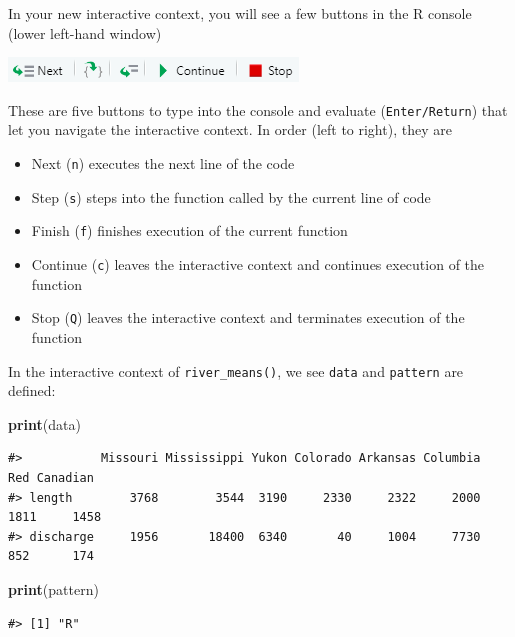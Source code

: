 \documentclass[
]{book}
\newenvironment{Shaded}{\begin{snugshade}}{\end{snugshade}}
\newcommand{\KeywordTok}[1]{\textcolor[rgb]{0.13,0.29,0.53}{\textbf{#1}}}
\newcommand{\NormalTok}[1]{#1}
\providecommand{\tightlist}{%
  \setlength{\itemsep}{0pt}\setlength{\parskip}{0pt}}
\begin{document}
In your new interactive context, you will see a few buttons in the R console (lower left-hand window)

\includegraphics[width=0.75\linewidth]{images/newrpack_files8}

These are five buttons to type into the console and evaluate (\texttt{Enter/Return}) that let you navigate the interactive context. In order (left to right), they are

\begin{itemize}
\tightlist
\item
  Next (\texttt{n}) executes the next line of the code
\item
  Step (\texttt{s}) steps into the function called by the current line of code
\item
  Finish (\texttt{f}) finishes execution of the current function
\item
  Continue (\texttt{c}) leaves the interactive context and continues execution of the function
\item
  Stop (\texttt{Q}) leaves the interactive context and terminates execution of the function
\end{itemize}

In the interactive context of \texttt{river\_means()}, we see \texttt{data} and \texttt{pattern} are defined:

\begin{Shaded}
\begin{Highlighting}[]
\KeywordTok{print}\NormalTok{(data)}
\end{Highlighting}
\end{Shaded}

\begin{verbatim}
#>           Missouri Mississippi Yukon Colorado Arkansas Columbia  Red Canadian
#> length        3768        3544  3190     2330     2322     2000 1811     1458
#> discharge     1956       18400  6340       40     1004     7730  852      174
\end{verbatim}

\begin{Shaded}
\begin{Highlighting}[]
\KeywordTok{print}\NormalTok{(pattern)}
\end{Highlighting}
\end{Shaded}

\begin{verbatim}
#> [1] "R"
\end{verbatim}
\end{document}
